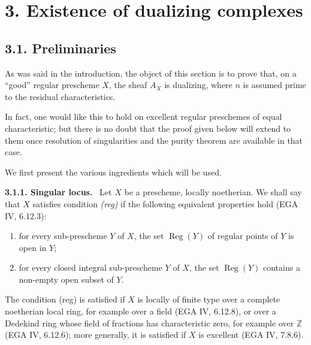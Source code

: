 \documentclass[11pt]{article}
\theoremstyle{plain}
\theoremstyle{definition}
\theoremstyle{remark}
\newenvironment{statement}[1]{\par\medskip\noindent\textbf{#1.}\ }{\par\medskip}
\newcommand{\ZZ}{\mathbb Z}
\DeclareMathOperator{\Reg}{Reg}
\begin{document}
\section*{3. Existence of dualizing complexes}

\subsection*{3.1. Preliminaries}

As was said in the introduction, the object of this section is to prove that, on a ``good'' regular prescheme $X$, the sheaf $A_X$ is dualizing, where $n$ is assumed prime to the residual characteristics.

In fact, one would like this to hold on excellent regular preschemes of equal characteristic; but there is no doubt that the proof given below will extend to them once resolution of singularities and the purity theorem are available in that case.

We first present the various ingredients which will be used.

\begin{statement}{3.1.1. Singular locus}
Let $X$ be a prescheme, locally noetherian. We shall say that $X$ satisfies condition \emph{(reg)} if the following equivalent properties hold (EGA IV, 6.12.3):
\begin{enumerate}[label=(\roman*)]
\item for every sub-prescheme $Y$ of $X$, the set $\Reg(Y)$ of regular points of $Y$ is open in $Y$;
\item for every closed integral sub-prescheme $Y$ of $X$, the set $\Reg(Y)$ contains a non-empty open subset of $Y$.
\end{enumerate}
The condition (reg) is satisfied if $X$ is locally of finite type over a complete noetherian local ring, for example over a field (EGA IV, 6.12.8), or over a Dedekind ring whose field of fractions has characteristic zero, for example over $\ZZ$ (EGA IV, 6.12.6); more generally, it is satisfied if $X$ is excellent (EGA IV, 7.8.6).
\end{statement}
\end{document}
